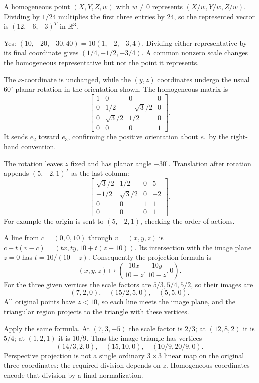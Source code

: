 A homogeneous point $(X,Y,Z,w)$ with $w\ne0$ represents
$(X/w,Y/w,Z/w)$. Dividing by $1/24$ multiplies the first three entries
by $24$, so the represented vector is
$\boxed{(12,-6,-3)^T}$ in $\mathbb{R}^3$.

Yes: $(10,-20,-30,40)=10(1,-2,-3,4)$.
Dividing either representative by its final coordinate gives
$(1/4,-1/2,-3/4)$. A common nonzero scale changes the homogeneous
representative but not the point it represents.

The $x$-coordinate is unchanged, while the $(y,z)$ coordinates undergo
the usual $60^\circ$ planar rotation in the orientation shown. The
homogeneous matrix is
\[
 \boxed{\begin{bmatrix}
 1&0&0&0\\0&1/2&-\sqrt3/2&0\\
 0&\sqrt3/2&1/2&0\\0&0&0&1
 \end{bmatrix}}.
\]
It sends $e_2$ toward $e_3$, confirming the positive orientation about
$e_1$ by the right-hand convention.

The rotation leaves $z$ fixed and has planar angle $-30^\circ$.
Translation after rotation appends $(5,-2,1)^T$ as the last column:
\[
 \boxed{\begin{bmatrix}
 \sqrt3/2&1/2&0&5\\-1/2&\sqrt3/2&0&-2\\0&0&1&1\\0&0&0&1
 \end{bmatrix}}.
\]
For example the origin is sent to $(5,-2,1)$, checking the order of actions.

A line from $c=(0,0,10)$ through $v=(x,y,z)$ is
$c+t(v-c)=(tx,ty,10+t(z-10))$.
Its intersection with the image plane $z=0$ has $t=10/(10-z)$.
Consequently the projection formula is
\[
 (x,y,z)\longmapsto\left(\frac{10x}{10-z},\frac{10y}{10-z},0\right).
\]
For the three given vertices the scale factors are $5/3,5/4,5/2$,
so their images are
\[
 \boxed{(7,2,0),\quad(15/2,5,0),\quad(5,5,0)}.
\]
All original points have $z<10$, so each line meets the image plane,
and the triangular region projects to the triangle with these vertices.

Apply the same formula. At $(7,3,-5)$ the scale factor is $2/3$;
at $(12,8,2)$ it is $5/4$; at $(1,2,1)$ it is $10/9$.
Thus the image triangle has vertices
\[
 \boxed{(14/3,2,0),\quad(15,10,0),\quad(10/9,20/9,0)}.
\]
Perspective projection is not a single ordinary $3\times3$ linear map
on the original three coordinates: the required division depends on $z$.
Homogeneous coordinates encode that division by a final normalization.

